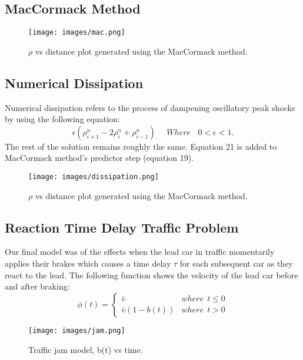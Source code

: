 \documentclass{article}
\begin{document}
\subsection{MacCormack Method}

\begin{figure}[H]
\begin{center}
\texttt{[image: images/mac.png]}
\caption{$\rho$ vs distance plot generated using the MacCormack method.}
\end{center}
\end{figure}

\subsection{Numerical Dissipation}
Numerical dissipation refers to the process of dampening oscillatory peak shocks by using the following equation:
\begin{equation}
\epsilon(\rho^n_{i+1}-2\rho^n_{i}+\rho^n_{i-1})\ \ \ \ \ \ 
Where \ \ \ \ 0 < \epsilon < 1.
\end{equation}
The rest of the solution remains roughly the same. Equation 21 is added to MacCormack method's predictor step (equation 19).

\begin{figure}[H]
\begin{center}
\texttt{[image: images/dissipation.png]}
\caption{$\rho$ vs distance plot generated using the MacCormack method.}
\end{center}
\end{figure}

\subsection{Reaction Time Delay Traffic Problem}
Our final model was of the effects when the lead car in traffic momentarily applies their brakes which causes a time delay $\tau$ for each subsequent car as they react to the lead. The following function shows the velocity of the lead car before and after braking:
\begin{equation}
\phi (t) =
\begin{cases} 
      \bar{v} & where \ \ t\leq 0 \\
      \bar{v}(1-b(t)) & where \ \ t > 0 
\end{cases}
\end{equation}

\begin{figure}[H]
\begin{center}
\texttt{[image: images/jam.png]}
\caption{Traffic jam model, b(t) vs time.}
\end{center}
\end{figure}
\end{document}
